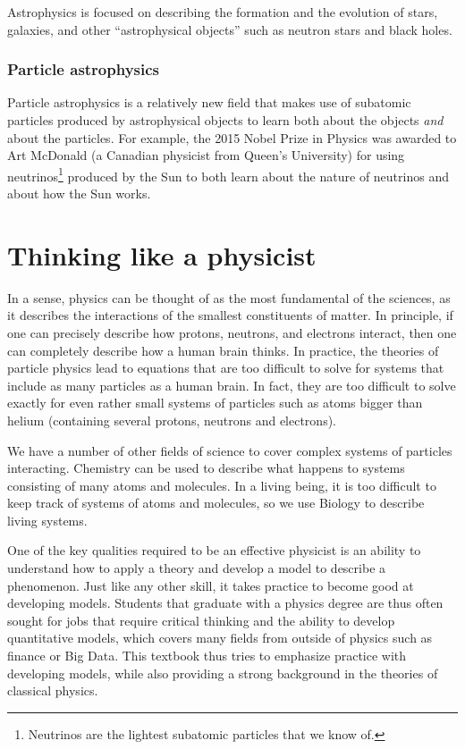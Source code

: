 \documentclass[9pt,Preprint]{lapreprint}
\begin{document}
Astrophysics is focused on describing the formation and the evolution of stars, galaxies, and other ``astrophysical objects'' such as neutron stars and black holes.

\subsubsection{Particle astrophysics}

Particle astrophysics is a relatively new field that makes use of subatomic particles produced by astrophysical objects to learn both about the objects \textit{and} about the particles. For example, the 2015 Nobel Prize in Physics was awarded to Art McDonald (a Canadian physicist from Queen's University) for using neutrinos\footnote{Neutrinos are the lightest subatomic particles that we know of.} produced by the Sun to both learn about the nature of neutrinos and about how the Sun works.

\section{Thinking like a physicist}

In a sense, physics can be thought of as the most fundamental of the sciences, as it describes the interactions of the smallest constituents of matter. In principle, if one can precisely describe how protons, neutrons, and electrons interact, then one can completely describe how a human brain thinks. In practice, the theories of particle physics lead to equations that are too difficult to solve for systems that include as many particles as a human brain. In fact, they are too difficult to solve exactly for even rather small systems of particles such as atoms bigger than helium (containing several protons, neutrons and electrons).

We have a number of other fields of science to cover complex systems of particles interacting. Chemistry can be used to describe what happens to systems consisting of many atoms and molecules. In a living being, it is too difficult to keep track of systems of atoms and molecules, so we use Biology to describe living systems.

One of the key qualities required to be an effective physicist is an ability to understand how to apply a theory and develop a model to describe a phenomenon. Just like any other skill, it takes practice to become good at developing models. Students that graduate with a physics degree are thus often sought for jobs that require critical thinking and the ability to develop quantitative models, which covers many fields from outside of physics such as finance or Big Data. This textbook thus tries to emphasize practice with developing models, while also providing a strong background in the theories of classical physics.
\end{document}
